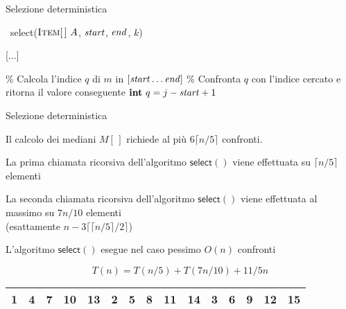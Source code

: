 \begin{frame}{Selezione deterministica}

\vspace{-12pt}
\small
\begin{Procedure}
\caption[A]{\Item\ \textsf{select}($\textsc{Item}[\,]\ A$, \INTEGER $\mathit{start}$, \INTEGER $\mathit{end}$, \INTEGER $k$)}
[...]\;

\BlankLine
\% Calcola l'indice $q$ di $m$ in $[\mathit{start} \ldots \mathit{end}]$\;
\% Confronta $q$ con l'indice cercato e ritorna il valore conseguente\;
$\INTEGER\ q = j-\Primo+1$\;
\end{Procedure}

\end{frame}


\begin{frame}{Selezione deterministica}

\vspace{-9pt}
\BIL
\item  Il calcolo dei mediani $M[\,]$ richiede al più $6 \lceil n/5 \rceil$  confronti.
\item La prima chiamata ricorsiva dell'algoritmo $\textsf{select}()$ viene effettuata su $\lceil n/5 \rceil$ elementi
\item La seconda chiamata ricorsiva dell'algoritmo $\textsf{select}()$ viene effettuata al massimo  su $7n/10$ elementi\\
 (esattamente $n - 3 \lceil  \lceil n/5 \rceil /2 \rceil$) 
\item L'algoritmo $\textsf{select}()$ esegue nel caso pessimo $O(n)$ confronti

\[
  T(n) = T(n/5) + T(7n/10) + 11/5n
\]
\EIL

\begin{center}
\begin{tabular}{|c|c|c|c|c||c|c|c|c|c||c|c|c|c|c|}
\hline
\alert{1} & \alert{4} & \alert{\textbf{7}} & 10 & 13 & \alert{2} & \alert{5} & \alert{\textbf{8}} & 11 & 14 & 3 & 6 & \textbf{9} & 12 & 15 \\\hline
\end{tabular}
\end{center}

\end{frame}


